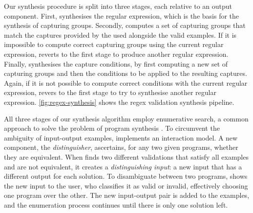 Our synthesis procedure is split into three stages, each relative to an output component. %
First, \Forest synthesises the regular expression, which is the basis for the synthesis of capturing groups.
Secondly, \Forest computes a set of capturing groups that match the captures provided by the used alongside the valid examples. If it is impossible to compute correct capturing groups using the current regular expression, \Forest reverts to the first stage to produce another regular expression.
Finally, \Forest synthesises the capture conditions, by first computing a new set of capturing groups and then the conditions to be applied to the resulting captures. Again, if it is not possible to compute correct conditions with the current regular expression, \Forest revers to the first stage to try to synthesise another regular expression.
\autoref{fig:regex-synthesis} shows the regex validation synthesis pipeline.

All three stages of our synthesis algorithm employ enumerative search, a common approach to solve the problem of program synthesis \cite{DBLP:conf/pldi/FengMBD18,DBLP:conf/pldi/FengMGDC17,AlphaRegex16,Orvalho19,DBLP:conf/cav/ReynoldsBNBT19}.
%
To circumvent the ambiguity of input-output examples,
\Forest{} implements an interaction model.
A new component, the \textit{distinguisher}, ascertains, for any two given programs, whether they are equivalent.
When \Forest finds two different validations that satisfy all examples and are not equivalent, it creates a \textit{distinguishing input}: a new input that has a different output for each solution.
%
To disambiguate between two programs,
\Forest shows the new input to the user, who classifies it as valid or invalid, effectively choosing one program over the other.
%
The new input-output pair is added to the examples, and the enumeration process continues until there is only one solution left.

\pagebreak

